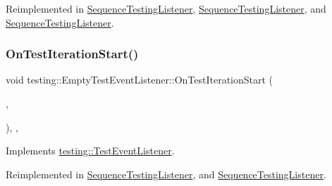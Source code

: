 Reimplemented in \mbox{\hyperlink{class_sequence_testing_listener_a345641262fa10cc4b251ac54116db74b}{Sequence\+Testing\+Listener}}, \mbox{\hyperlink{class_sequence_testing_listener_a31ffb1bb77e88fff266511b1d8427e20}{Sequence\+Testing\+Listener}}, and \mbox{\hyperlink{class_sequence_testing_listener_a31ffb1bb77e88fff266511b1d8427e20}{Sequence\+Testing\+Listener}}.

\mbox{\label{classtesting_1_1_empty_test_event_listener_a31edf103561e8b4d747656bc2d927661}} 
\subsubsection{\texorpdfstring{OnTestIterationStart()}{OnTestIterationStart()}\hspace{0.1cm}{\footnotesize\ttfamily [2/3]}}
{\footnotesize\ttfamily void testing\+::\+Empty\+Test\+Event\+Listener\+::\+On\+Test\+Iteration\+Start (\begin{DoxyParamCaption}\item[{const \mbox{\hyperlink{classtesting_1_1_unit_test}{Unit\+Test}} \&}]{,  }\item[{int}]{ }\end{DoxyParamCaption})\hspace{0.3cm}{\ttfamily [inline]}, {\ttfamily [override]}, {\ttfamily [virtual]}}



Implements \mbox{\hyperlink{classtesting_1_1_test_event_listener_a60cc09b7907cb329d152eb5e7133bdeb}{testing\+::\+Test\+Event\+Listener}}.



Reimplemented in \mbox{\hyperlink{class_sequence_testing_listener_a345641262fa10cc4b251ac54116db74b}{Sequence\+Testing\+Listener}}, and \mbox{\hyperlink{class_sequence_testing_listener_a31ffb1bb77e88fff266511b1d8427e20}{Sequence\+Testing\+Listener}}.

\mbox{\label{classtesting_1_1_empty_test_event_listener_a31edf103561e8b4d747656bc2d927661}} 
